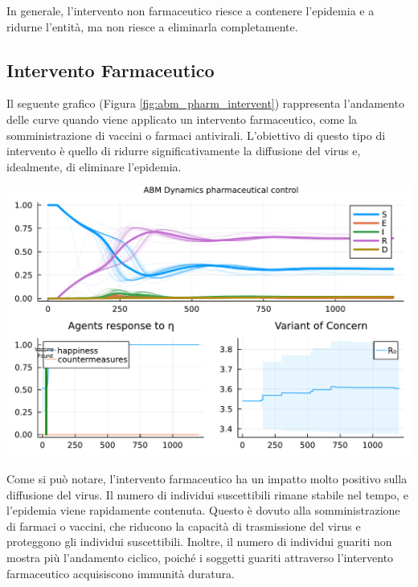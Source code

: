 In generale, l'intervento non farmaceutico riesce a contenere 
l'epidemia e a ridurne l'entità, ma non riesce a eliminarla 
completamente.

\subsection{Intervento Farmaceutico}

Il seguente grafico (Figura \ref{fig:abm_pharm_intervent}) 
rappresenta l'andamento delle curve quando viene applicato un 
intervento farmaceutico, come la somministrazione di vaccini o 
farmaci antivirali. L'obiettivo di questo tipo di intervento è 
quello di ridurre significativamente la diffusione del virus e, 
idealmente, di eliminare l'epidemia.

\begin{minipage}{\linewidth}
    \centering
    \includegraphics[width=\textwidth]{img/SocialNetworkABM_VACCINE.pdf}
    \label{fig:abm_pharm_intervent}
\end{minipage}

Come si può notare, l'intervento farmaceutico ha un impatto 
molto positivo sulla diffusione del virus. Il numero di individui 
suscettibili rimane stabile nel tempo, e l'epidemia viene rapidamente 
contenuta. Questo è dovuto alla somministrazione di farmaci o vaccini, 
che riducono la capacità di trasmissione del virus e proteggono gli 
individui suscettibili. Inoltre, il numero di individui guariti non 
mostra più l'andamento ciclico, poiché i soggetti guariti attraverso 
l'intervento farmaceutico acquisiscono immunità duratura.

